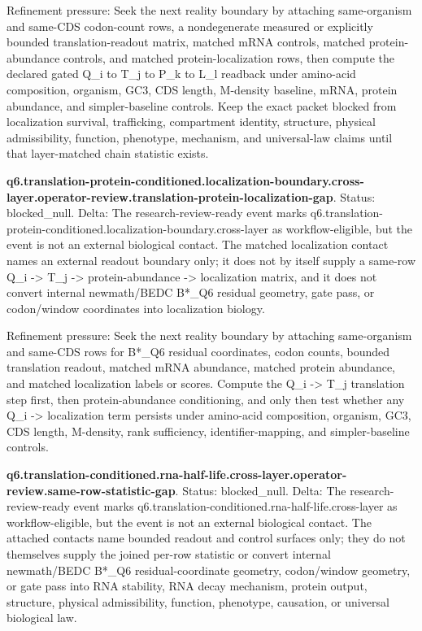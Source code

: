 Refinement pressure: Seek the next reality boundary by attaching same-organism and same-CDS codon-count rows, a nondegenerate measured or explicitly bounded translation-readout matrix, matched mRNA controls, matched protein-abundance controls, and matched protein-localization rows, then compute the declared gated Q\_i to T\_j to P\_k to L\_l readback under amino-acid composition, organism, GC3, CDS length, M-density baseline, mRNA, protein abundance, and simpler-baseline controls. Keep the exact packet blocked from localization survival, trafficking, compartment identity, structure, physical admissibility, function, phenotype, mechanism, and universal-law claims until that layer-matched chain statistic exists.

\textbf{q6.translation-protein-conditioned.localization-boundary.cross-layer.operator-review.translation-protein-localization-gap}. Status: blocked\_null. Delta: The research-review-ready event marks q6.translation-protein-conditioned.localization-boundary.cross-layer as workflow-eligible, but the event is not an external biological contact. The matched localization contact names an external readout boundary only; it does not by itself supply a same-row Q\_i -> T\_j -> protein-abundance -> localization matrix, and it does not convert internal newmath/BEDC B*\_Q6 residual geometry, gate pass, or codon/window coordinates into localization biology.

Refinement pressure: Seek the next reality boundary by attaching same-organism and same-CDS rows for B*\_Q6 residual coordinates, codon counts, bounded translation readout, matched mRNA abundance, matched protein abundance, and matched localization labels or scores. Compute the Q\_i -> T\_j translation step first, then protein-abundance conditioning, and only then test whether any Q\_i -> localization term persists under amino-acid composition, organism, GC3, CDS length, M-density, rank sufficiency, identifier-mapping, and simpler-baseline controls.

\textbf{q6.translation-conditioned.rna-half-life.cross-layer.operator-review.same-row-statistic-gap}. Status: blocked\_null. Delta: The research-review-ready event marks q6.translation-conditioned.rna-half-life.cross-layer as workflow-eligible, but the event is not an external biological contact. The attached contacts name bounded readout and control surfaces only; they do not themselves supply the joined per-row statistic or convert internal newmath/BEDC B*\_Q6 residual-coordinate geometry, codon/window geometry, or gate pass into RNA stability, RNA decay mechanism, protein output, structure, physical admissibility, function, phenotype, causation, or universal biological law.


